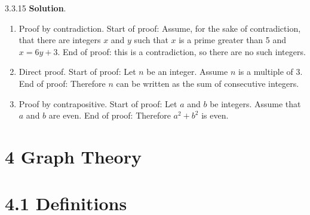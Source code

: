 \documentclass[11pt,]{book}
\theoremstyle{ptxplainnotitle}
\theoremstyle{ptxplaintitle}
\theoremstyle{ptxdefinitionnotitle}
\theoremstyle{ptxdefinitiontitle}
\theoremstyle{ptxdefinitionnotitle}
\theoremstyle{ptxdefinitiontitle}
\theoremstyle{ptxdefinitionnotitle}
\theoremstyle{ptxdefinitiontitle}
\theoremstyle{ptxdefinitiontitlenonumber}
\theoremstyle{ptxdefinitiontitlenonumber}
\numberwithin{equation}{chapter}
\begin{document}
\begin{divisionexercise}{3.3.15}
\textbf{Solution}.\quad%
\hypertarget{p-2525}{}%
\leavevmode%
\begin{enumerate}[label=(\alph*)]
\item\hypertarget{li-1263}{}\hypertarget{p-2526}{}%
Proof by contradiction. Start of proof: Assume, for the sake of contradiction, that there are integers \(x\) and \(y\) such that \(x\) is a prime greater than 5 and \(x = 6y + 3\). End of proof: \textellipsis{} this is a contradiction, so there are no such integers.%
\item\hypertarget{li-1264}{}\hypertarget{p-2527}{}%
Direct proof. Start of proof: Let \(n\) be an integer. Assume \(n\) is a multiple of 3. End of proof: Therefore \(n\) can be written as the sum of consecutive integers.%
\item\hypertarget{li-1265}{}\hypertarget{p-2528}{}%
Proof by contrapositive. Start of proof: Let \(a\) and \(b\) be integers. Assume that \(a\) and \(b\) are even. End of proof: Therefore \(a^2 + b^2\) is even.%
\end{enumerate}
%
\end{divisionexercise}%
\section*{4 Graph Theory}
\section*{4.1 Definitions}
\end{document}
